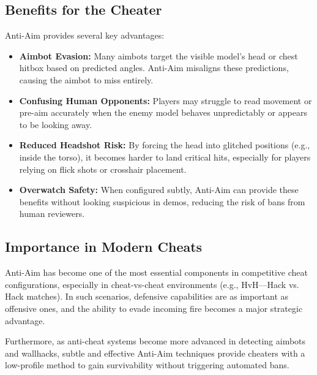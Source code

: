 \subsection{Benefits for the Cheater}

Anti-Aim provides several key advantages:

\begin{itemize}
    \item \textbf{Aimbot Evasion:} Many aimbots target the visible model's head or chest hitbox based on predicted angles. Anti-Aim misaligns these predictions, causing the aimbot to miss entirely.
    
    \item \textbf{Confusing Human Opponents:} Players may struggle to read movement or pre-aim accurately when the enemy model behaves unpredictably or appears to be looking away.
    
    \item \textbf{Reduced Headshot Risk:} By forcing the head into glitched positions (e.g., inside the torso), it becomes harder to land critical hits, especially for players relying on flick shots or crosshair placement.
    
    \item \textbf{Overwatch Safety:} When configured subtly, Anti-Aim can provide these benefits without looking suspicious in demos, reducing the risk of bans from human reviewers.
\end{itemize}

\subsection{Importance in Modern Cheats}

Anti-Aim has become one of the most essential components in competitive cheat configurations, especially in cheat-vs-cheat environments (e.g., HvH—Hack vs. Hack matches). In such scenarios, defensive capabilities are as important as offensive ones, and the ability to evade incoming fire becomes a major strategic advantage.

Furthermore, as anti-cheat systems become more advanced in detecting aimbots and wallhacks, subtle and effective Anti-Aim techniques provide cheaters with a low-profile method to gain survivability without triggering automated bans.






\newpage
\newpage
\newpage
\newpage




